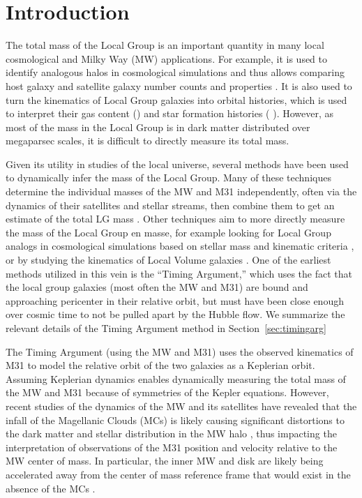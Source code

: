 \documentclass[twocolumn]{aastex631}
\begin{document}
\section{Introduction}
\label{sec:intro}
The total mass of the Local Group is an important quantity in many local
cosmological and Milky Way (MW) applications.
For example, it is used to identify analogous halos in cosmological simulations
and thus allows comparing host galaxy and satellite galaxy number counts and
properties \citep{Patel2017a, Dooley2017, Besla2018, Patel2018, Sawala2022}
.
It is also used to turn the kinematics of Local Group galaxies into orbital
histories, which is used to interpret their gas content () and star formation histories ( \citep{Weisz2011}).
However, as most of the mass in the Local Group is in dark matter distributed
over megaparsec scales, it is difficult to directly measure its total mass.

Given its utility in studies of the local universe, several methods have been
used to dynamically infer the mass of the Local Group.
Many of these techniques determine the individual masses of the MW and M31
independently, often via the dynamics of their satellites and stellar streams,
then combine them to get an estimate of the total LG
mass \citep{Watkins2010,Diaz2014,Patel2018} .
Other techniques aim to more directly measure the mass of the Local Group en
masse, for example looking for Local Group analogs in cosmological simulations
based on stellar mass and kinematic criteria \citep{Zhai2020}, or by studying
the kinematics of Local Volume galaxies \citep{Penarrubia2014} .
One of the earliest methods utilized in this vein is the ``Timing Argument,''
which uses the fact that the local group galaxies (most often the MW and M31)
are bound and approaching pericenter in their relative orbit, but must have been
close enough over cosmic time to not be pulled apart by the Hubble flow. We
summarize the relevant details of the Timing Argument method in
Section~\ref{sec:timingarg}

The Timing Argument (using the MW and M31) uses the observed kinematics of M31
to model the relative orbit of the two galaxies as a Keplerian orbit.
Assuming Keplerian dynamics enables dynamically measuring the total mass of the
MW and M31 because of symmetries  of the Kepler
equations.
However, recent studies of the dynamics of the MW and its satellites have
revealed that the infall of the Magellanic Clouds (MCs) is likely causing
significant distortions to the dark matter and stellar distribution in the MW
halo , thus impacting the interpretation of observations of
the M31 position and velocity relative to the MW center of mass.
In particular, the inner MW and disk are likely being accelerated away from the
center of mass reference frame that would exist in the absence of the MCs
\citep{Gomez2015, Garavito-Camargo2021b}.
\end{document}
